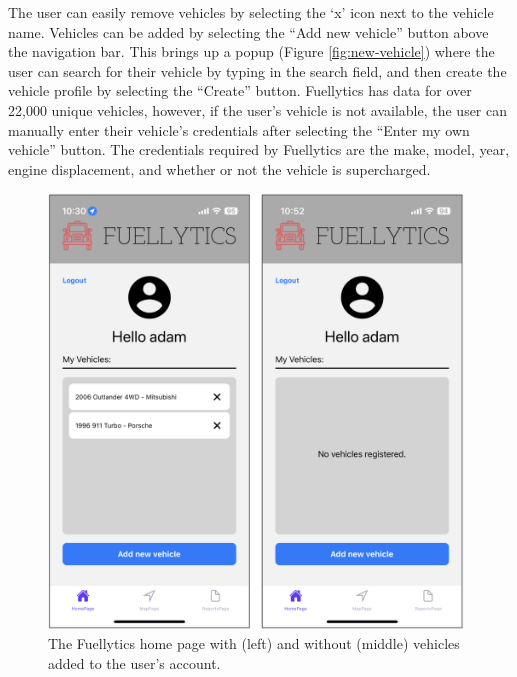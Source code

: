 \documentclass[11pt, oneside]{article}
\begin{document}
The user can easily remove vehicles by selecting the `x' icon next to the vehicle name. Vehicles can be added by selecting the ``Add new vehicle'' button above the navigation bar.  This brings up a popup (Figure \ref*{fig:new-vehicle}) where the user can search for their vehicle by typing in the search field, and then create the vehicle profile by selecting the ``Create'' button.  Fuellytics has data for over 22,000 unique vehicles, however, if the user's vehicle is not available, the user can manually enter their vehicle's credentials after selecting the ``Enter my own vehicle'' button.  The credentials required by Fuellytics are the make, model, year, engine displacement, and whether or not the vehicle is supercharged.
\begin{figure}[H]
\centerline{\includegraphics[width=11cm]{img/homepage.png}}
\caption{\label{fig:homepage} The Fuellytics home page with (left) and without (middle) vehicles added to the user's account.}
\end{figure}
\end{document}
